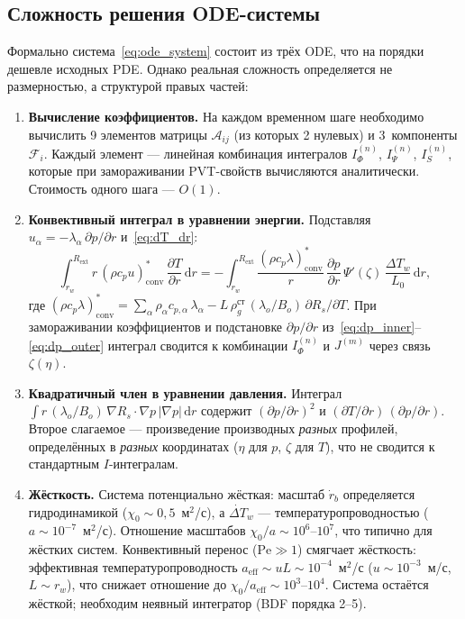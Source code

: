 \documentclass[12pt,a4paper]{article}
\newcommand{\dd}{\mathrm{d}}
\newcommand{\pp}{\partial}
\newcommand{\ext}{\mathrm{ext}}
\newcommand{\eff}{\mathrm{eff}}
\newcommand{\st}{\text{ст}}
\begin{document}
\subsection{Сложность решения ODE-системы}

Формально система~\eqref{eq:ode_system} состоит из трёх ODE,
что на порядки дешевле исходных PDE. Однако реальная сложность
определяется не размерностью, а структурой правых частей:

\begin{enumerate}[nosep]
  \item \textbf{Вычисление коэффициентов.}
        На каждом временном шаге необходимо вычислить 9 элементов
        матрицы $\mathcal{A}_{ij}$ (из которых 2 нулевых)
        и 3~компоненты $\mathcal{F}_i$. Каждый элемент ---
        линейная комбинация интегралов $I_\Phi^{(n)}$,
        $I_\Psi^{(n)}$, $I_S^{(n)}$, которые при замораживании
        PVT-свойств вычисляются аналитически.
        Стоимость одного шага --- $O(1)$.

  \item \textbf{Конвективный интеграл в уравнении энергии.}
        Подставляя $u_\alpha = -\lambda_\alpha\,\pp p/\pp r$
        и~\eqref{eq:dT_dr}:
        \[
          \int_{r_w}^{R_\ext} r\,(\rho c_p u)_\mathrm{conv}^*\,
            \frac{\pp T}{\pp r}\,\dd r
          = -\int_{r_w}^{R_\ext}
            \frac{(\rho c_p \lambda)_\mathrm{conv}^*}{r}\,
            \frac{\pp p}{\pp r}\,
            \Psi'(\zeta)\,\frac{\Delta T_w}{L_0}\,\dd r,
        \]
        где $(\rho c_p \lambda)_\mathrm{conv}^*
        = \sum_\alpha \rho_\alpha c_{p,\alpha}\,\lambda_\alpha
          - L\,\rho_g^\st\,(\lambda_o/B_o)\,\pp R_s/\pp T$.
        При замораживании коэффициентов и подстановке
        $\pp p/\pp r$ из~\eqref{eq:dp_inner}--\eqref{eq:dp_outer}
        интеграл сводится к комбинации $I_\Phi^{(n)}$
        и $J^{(m)}$ через связь $\zeta(\eta)$.

  \item \textbf{Квадратичный член в уравнении давления.}
        Интеграл $\int r\,(\lambda_o/B_o)\,\nabla R_s\cdot\nabla p\,
        |\nabla p|\,\dd r$ содержит $(\pp p/\pp r)^2$ и
        $(\pp T/\pp r)\,(\pp p/\pp r)$. Второе слагаемое ---
        произведение производных \emph{разных} профилей,
        определённых в \emph{разных} координатах
        ($\eta$ для $p$, $\zeta$ для $T$), что не сводится
        к стандартным $I$-интегралам.

  \item \textbf{Жёсткость.}
        Система потенциально жёсткая: масштаб $\dot{r}_b$
        определяется гидродинамикой ($\chi_0 \sim 0{,}5$~м$^2$/с),
        а $\dot{\Delta T}_w$ --- температуропроводностью
        ($a \sim 10^{-7}$~м$^2$/с). Отношение масштабов
        $\chi_0/a \sim 10^6$--$10^7$, что типично
        для жёстких систем.
        Конвективный перенос ($\mathrm{Pe} \gg 1$) смягчает
        жёсткость: эффективная температуропроводность
        $a_\eff \sim uL \sim 10^{-4}$~м$^2$/с
        ($u \sim 10^{-3}$~м/с, $L \sim r_w$), что
        снижает отношение до $\chi_0/a_\eff \sim 10^3$--$10^4$.
        Система остаётся жёсткой; необходим неявный
        интегратор (BDF порядка 2--5).


\end{enumerate}
\end{document}
